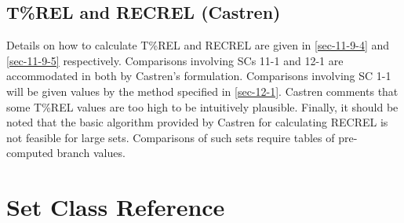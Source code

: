 \documentclass{article}
\begin{document}
\subsection{T\%REL and RECREL (Castren)}
\label{sec-12-6}

Details on how to calculate T\%REL and RECREL are given in \ref{sec-11-9-4} and
\ref{sec-11-9-5} respectively. Comparisons involving SCs 11-1 and 12-1 are
accommodated in both by Castren's formulation. Comparisons involving
SC 1-1 will be given values by the method specified in \ref{sec-12-1}. Castren comments that some T\%REL values are too high to be
intuitively plausible. Finally, it should be noted that the basic
algorithm provided by Castren for calculating RECREL is not feasible
for large sets. Comparisons of such sets require tables of pre-computed
branch values.
\section{Set Class Reference}
\label{sec-13}
\end{document}
